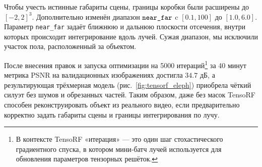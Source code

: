 Чтобы учесть истинные габариты сцены, границы коробки были
расширены до $[-2,2]^3$. Дополнительно изменён диапазон
$\verb|near_far|$ c $[0.1,100]$ до $[1.0,6.0]$.
Параметр \texttt{near\_far} задаёт ближнюю и дальнюю плоскости
отсечения, внутри которых происходит интегрирование вдоль лучей.
Сужая диапазон, мы исключили участок пола, расположенный
за объектом.

После внесения правок и запуска оптимизации на 5000 итераций\footnote{В
контексте TensoRF «итерация» — это один шаг стохастического градиентного спуска,
в котором мини‑батч лучей используется для обновления параметров тензорных
решёток.} за 40 минут метрика PSNR на валидационных изображениях достигла $34.7$ дБ, а
результирующая трёхмерная модель (рис.~\ref{fig:tensorf_eleph})
приобрела чёткий силуэт без шумов и обрезанных частей. Таким образом, даже без
масок TensoRF способен реконструировать объект из реального видео, если
предварительно корректно задать габариты сцены и границы интегрирования по лучу.
